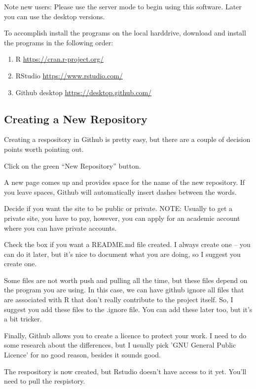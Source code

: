 \documentclass[12pt]{../SOP4_alpha}\usepackage[]{graphicx}\usepackage[]{xcolor}
\begin{document}
\NP Note new users: Please use the server mode to begin using this software. Later you can use the desktop versions. 

\NP To accomplish install the programs on the local harddrive, download and install the programs in the following order: 

\begin{enumerate}
  \item R \url{https://cran.r-project.org/}
  \item RStudio \url{https://www.rstudio.com/}
  \item Github desktop \url{https://desktop.github.com/}
\end{enumerate}

\subsection{Creating a New Repository}

\NP Creating a respository in Github is pretty easy, but there are a couple of decision points worth pointing out.

\NP Click on the green ``New Repository'' button.

\NP A new page comes up and provides space for the name of the new repository. If you leave spaces, Github will automatically insert dashes between the words.

\NP Decide if you want the site to be public or private. NOTE: Usually to get a private site, you have to pay, however, you can apply for an academic account where you can have private accounts. 

\NP Check the box if you want a README.md file created. I always create one -- you can do it later, but it's nice to document what you are doing, so I suggest you create one.

\NP Some files are not worth push and pulling all the time, but these files depend on the program you are using. In this case, we can have github ignore all files that are associated with R that don't really contribute to the project itself. So, I suggest you add these files to the .ignore file. You can add these later too, but it's a bit tricker.

\NP Finally, Github allows you to create a licence to protect your work. I need to do some research about the differences, but I usually pick 'GNU General Public Licence' for no good reason, besides it sounds good.

\NP The respository is now created, but Rstudio doesn't have access to it yet. You'll need to pull the respistory.
\end{document}

